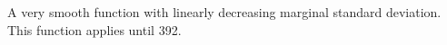 A very smooth function with linearly decreasing marginal standard deviation. This function applies until  392.